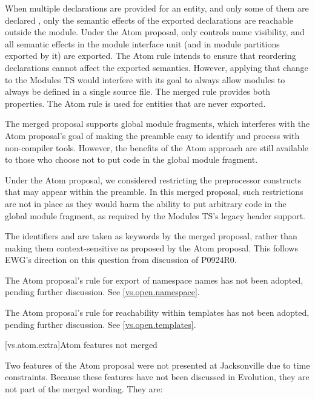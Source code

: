\pnum
When multiple declarations are provided for an entity,
and only some of them are declared ,
only the semantic effects of the exported declarations
are reachable outside the module.
Under the Atom proposal,
 only controls name visibility,
and all semantic effects in the module interface unit
(and in module partitions exported by it)
are exported.
The Atom rule intends to ensure that
reordering declarations cannot affect the exported semantics.
However, applying that change to the Modules TS
would interfere with its goal to always allow modules
to always be defined in a single source file.
The merged rule provides both properties.
The Atom rule is used for entities that are never exported.

\pnum
The merged proposal supports global module fragments,
which interferes with the Atom proposal's goal
of making the preamble easy to identify and process
with non-compiler tools.
However, the benefits of the Atom approach are still available
to those who choose not to put code in the global module fragment.

\pnum
Under the Atom proposal,
we considered restricting the preprocessor constructs that may appear
within the preamble.
In this merged proposal,
such restrictions are not in place
as they would harm the ability
to put arbitrary code in the global module fragment,
as required by the Modules TS's legacy header support.

\pnum
The identifiers  and  are taken as keywords
by the merged proposal,
rather than making them context-sensitive as proposed by the Atom proposal.
This follows EWG's direction on this question from discussion of P0924R0.

\pnum
The Atom proposal's rule for export of namespace names has not been adopted,
pending further discussion. See \ref{vs.open.namespace}.

\pnum
The Atom proposal's rule for reachability within templates has not been adopted,
pending further discussion. See \ref{vs.open.templates}.

[vs.atom.extra]{Atom features not merged}

\pnum
Two features of the Atom proposal were not presented at Jacksonville
due to time constraints.
Because these features have not been discussed in Evolution,
they are not part of the merged wording. They are:

